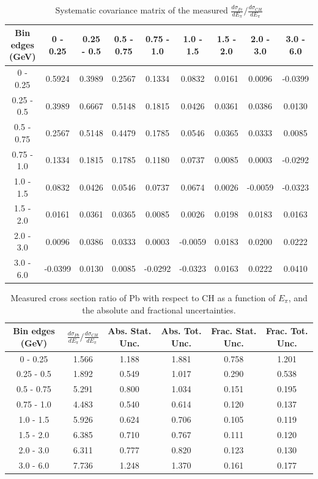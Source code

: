 \documentclass[aps,prl,twocolumn,superscriptaddress,nofootinbib]{revtex4-1}
\begin{document}
\begin{table}[h!]
  \centering
  \caption{Systematic covariance matrix of the measured $\frac{d\sigma_{Fe}}{dE_{\pi}}/\frac{d\sigma_{CH}}{dE_{\pi}}$}
    \begin{tabular}{c||cccccccc}
      Bin edges (GeV) & 0 - 0.25 & 0.25 - 0.5 & 0.5 - 0.75 & 0.75 - 1.0 & 1.0 - 1.5 & 1.5 - 2.0 & 2.0 - 3.0 & 3.0 - 6.0 \\
\hline \hline
        0 - 0.25 &  0.5924 &  0.3989 &  0.2567 &  0.1334 &  0.0832 &  0.0161 &  0.0096 & -0.0399 \\
      0.25 - 0.5 &  0.3989 &  0.6667 &  0.5148 &  0.1815 &  0.0426 &  0.0361 &  0.0386 &  0.0130 \\
      0.5 - 0.75 &  0.2567 &  0.5148 &  0.4479 &  0.1785 &  0.0546 &  0.0365 &  0.0333 &  0.0085 \\
      0.75 - 1.0 &  0.1334 &  0.1815 &  0.1785 &  0.1180 &  0.0737 &  0.0085 &  0.0003 & -0.0292 \\
       1.0 - 1.5 &  0.0832 &  0.0426 &  0.0546 &  0.0737 &  0.0674 &  0.0026 & -0.0059 & -0.0323 \\
       1.5 - 2.0 &  0.0161 &  0.0361 &  0.0365 &  0.0085 &  0.0026 &  0.0198 &  0.0183 &  0.0163 \\
       2.0 - 3.0 &  0.0096 &  0.0386 &  0.0333 &  0.0003 & -0.0059 &  0.0183 &  0.0200 &  0.0222 \\
       3.0 - 6.0 & -0.0399 &  0.0130 &  0.0085 & -0.0292 & -0.0323 &  0.0163 &  0.0222 &  0.0410 \\
    \end{tabular}
  \label{tablecov:Fe_Systematic_Epi}
\end{table}

\begin{table}[h!]
  \centering
  \caption{Measured cross section ratio of Pb with respect to CH as a function
  of $E_{\pi}$,  and the absolute and fractional uncertainties.}
    \begin{tabular}{c||c||c|c||c|c}
      Bin edges (GeV) & $\frac{d\sigma_{Pb}}{dE_{\pi}}/\frac{d\sigma_{CH}}{dE_{\pi}}$ & Abs. Stat. Unc. & Abs. Tot. Unc. & Frac. Stat. Unc. & Frac. Tot. Unc. \\
      \hline\hline
        0 - 0.25 & 1.566 & 1.188 & 1.881 & 0.758 & 1.201 \\
      0.25 - 0.5 & 1.892 & 0.549 & 1.017 & 0.290 & 0.538 \\
      0.5 - 0.75 & 5.291 & 0.800 & 1.034 & 0.151 & 0.195 \\
      0.75 - 1.0 & 4.483 & 0.540 & 0.614 & 0.120 & 0.137 \\
       1.0 - 1.5 & 5.926 & 0.624 & 0.706 & 0.105 & 0.119 \\
       1.5 - 2.0 & 6.385 & 0.710 & 0.767 & 0.111 & 0.120 \\
       2.0 - 3.0 & 6.311 & 0.777 & 0.820 & 0.123 & 0.130 \\
       3.0 - 6.0 & 7.736 & 1.248 & 1.370 & 0.161 & 0.177 \\
    \end{tabular}
  \label{table:EpiXSecRatio_Pb}
\end{table}
\end{document}
